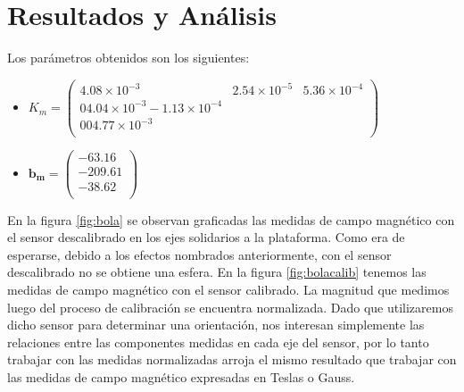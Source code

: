 \documentclass[main]{subfiles}
\begin{document}

\section{Resultados y Análisis}
Los par\'ametros obtenidos son los siguientes:


\begin{itemize}
\item $K_m=\left( \begin{array}{ccc}
  4.08 \times 10^{-3}    &  2.54\times 10^{-5}  &    5.36\times 10^{-4}\\
                          0       4.04\times 10^{-3}     -1.13\times 10^{-4} \\
                         0                         0       4.77\times 10^{-3} \\
\end{array}
\right)
$

\item $
\mathbf{b_m}=\left(\begin{array}{c}
	-63.16\\
    -209.61\\
    -38.62\\
\end{array}\right)
$
\end{itemize}


En la figura \ref{fig:bola} se observan graficadas las medidas de campo magnético con el sensor descalibrado en los ejes solidarios a la plataforma. Como era de esperarse, debido a los efectos nombrados anteriormente, con el sensor descalibrado no se obtiene una esfera. En la figura \ref{fig:bolacalib} tenemos las medidas de campo magnético con el sensor calibrado. La magnitud que medimos luego del proceso de calibración se encuentra normalizada. Dado que utilizaremos dicho sensor para determinar una orientación, nos interesan simplemente las relaciones entre las componentes medidas en cada eje del sensor, por lo tanto trabajar con las medidas normalizadas arroja el mismo resultado que trabajar con las medidas de campo magn\'etico expresadas en Teslas o Gauss.\\
\end{document}
